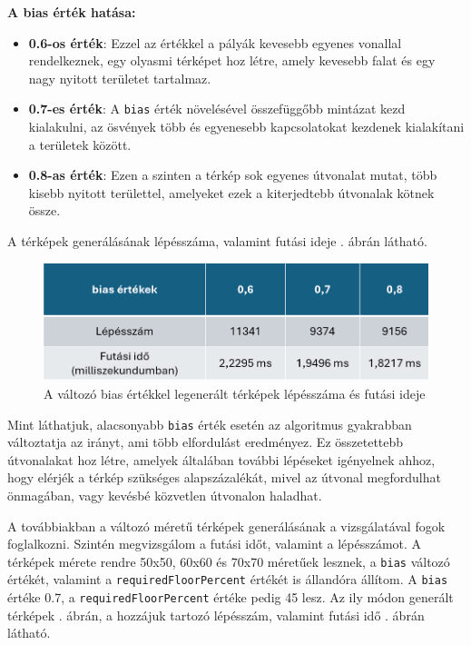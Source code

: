\textbf{A bias érték hatása:}
\begin{itemize}
\item \textbf{0.6-os érték}: Ezzel az értékkel a pályák kevesebb egyenes vonallal rendelkeznek, egy olyasmi térképet hoz létre, amely kevesebb falat és egy nagy nyitott területet tartalmaz.
\item \textbf{0.7-es érték}: A \texttt{bias} érték növelésével összefüggőbb mintázat kezd kialakulni, az ösvények több és egyenesebb kapcsolatokat kezdenek kialakítani a területek között.
\item \textbf{0.8-as érték}: Ezen a szinten a térkép sok egyenes útvonalat mutat, több kisebb nyitott területtel, amelyeket ezek a kiterjedtebb útvonalak kötnek össze.
\end{itemize}

A térképek generálásának lépésszáma, valamint futási ideje . ábrán látható.

\begin{figure}[ht]
\centering
\includegraphics[width=\textwidth]{images/fixedpercentruntimestepcount.png}
\caption{A változó bias értékkel legenerált térképek lépésszáma és futási ideje}
\label{fig:fixedpercentruntimestepcount}
\end{figure}

Mint láthatjuk, alacsonyabb \texttt{bias} érték esetén az algoritmus gyakrabban változtatja az irányt, ami több elfordulást eredményez. Ez összetettebb útvonalakat hoz létre, amelyek általában további lépéseket igényelnek ahhoz, hogy elérjék a térkép szükséges alapszázalékát, mivel az útvonal megfordulhat önmagában, vagy kevésbé közvetlen útvonalon haladhat.

A továbbiakban a változó méretű térképek generálásának a vizsgálatával fogok foglalkozni. Szintén megvizsgálom a futási időt, valamint a lépésszámot. A térképek mérete rendre 50x50, 60x60 és 70x70 méretűek lesznek, a \texttt{bias} változó értékét, valamint a \texttt{requiredFloorPercent} értékét is állandóra állítom. A \texttt{bias} értéke 0.7, a \texttt{requiredFloorPercent} értéke pedig 45 lesz. Az ily módon generált térképek . ábrán, a hozzájuk tartozó lépésszám, valamint futási idő . ábrán látható.

